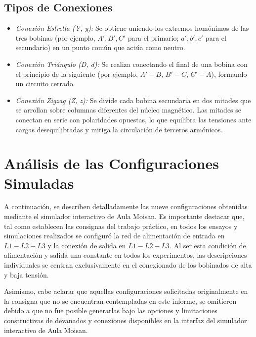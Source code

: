 \subsection{Tipos de Conexiones}
\begin{itemize}
    \item \textit{Conexión Estrella (Y, y):} Se obtiene uniendo los extremos homónimos de las tres bobinas (por ejemplo,
    $A', B', C'$ para el primario; $a', b', c'$ para el secundario) en un punto común que actúa como neutro.
    \item \textit{Conexión Triángulo (D, d):} Se realiza conectando el final de una bobina con el principio de la siguiente
    (por ejemplo, $A'-B$, $B'-C$, $C'-A$), formando un circuito cerrado.
    \item \textit{Conexión Zigzag (Z, z):} Se divide cada bobina secundaria en dos mitades que se arrollan sobre columnas
    diferentes del núcleo magnético. Las mitades se conectan en serie con polaridades opuestas, lo que equilibra las tensiones
    ante cargas desequilibradas y mitiga la circulación de terceros armónicos.
\end{itemize}

\newpage

\section{Análisis de las Configuraciones Simuladas}

A continuación, se describen detalladamente las nueve configuraciones obtenidas mediante el simulador interactivo de Aula Moisan.
Es importante destacar que, tal como establecen las consignas del trabajo práctico, en todos los ensayos y simulaciones realizados
se configuró la red de alimentación de entrada en $L1-L2-L3$ y la conexión de salida en $L1-L2-L3$. Al ser esta condición de
alimentación y salida una constante en todos los experimentos, las descripciones individuales se centran exclusivamente en el
conexionado de los bobinados de alta y baja tensión.

Asimismo, cabe aclarar que aquellas configuraciones solicitadas originalmente en la consigna que no se encuentran contempladas
en este informe, se omitieron debido a que no fue posible generarlas bajo las opciones y limitaciones constructivas de
devanados y conexiones disponibles en la interfaz del simulador interactivo de Aula Moisan.

